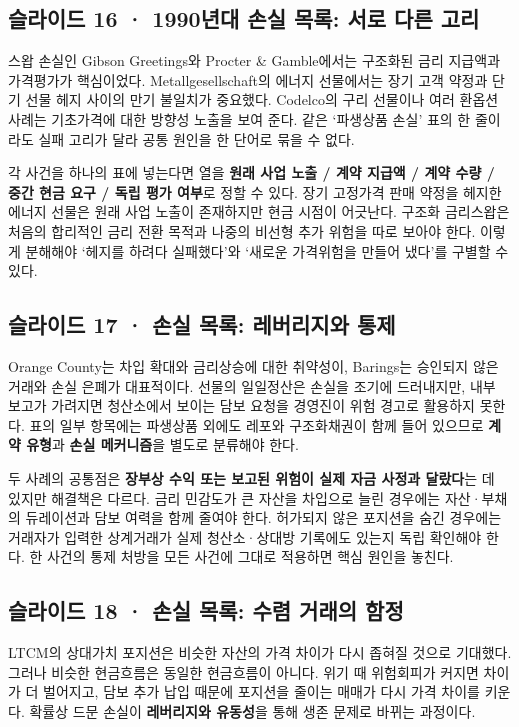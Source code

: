\documentclass[11pt,a4paper]{article}
\begin{document}
\subsection{슬라이드 16 · 1990년대 손실 목록: 서로 다른 고리}
스왑 손실인 Gibson Greetings와 Procter \& Gamble에서는 구조화된 금리 지급액과 가격평가가 핵심이었다. Metallgesellschaft의 에너지 선물에서는 장기 고객 약정과 단기 선물 헤지 사이의 만기 불일치가 중요했다. Codelco의 구리 선물이나 여러 환옵션 사례는 기초가격에 대한 방향성 노출을 보여 준다. 같은 ‘파생상품 손실’ 표의 한 줄이라도 실패 고리가 달라 공통 원인을 한 단어로 묶을 수 없다.\par

각 사건을 하나의 표에 넣는다면 열을 \textbf{원래 사업 노출 / 계약 지급액 / 계약 수량 / 중간 현금 요구 / 독립 평가 여부}로 정할 수 있다. 장기 고정가격 판매 약정을 헤지한 에너지 선물은 원래 사업 노출이 존재하지만 현금 시점이 어긋난다. 구조화 금리스왑은 처음의 합리적인 금리 전환 목적과 나중의 비선형 추가 위험을 따로 보아야 한다. 이렇게 분해해야 ‘헤지를 하려다 실패했다’와 ‘새로운 가격위험을 만들어 냈다’를 구별할 수 있다.\par

\subsection{슬라이드 17 · 손실 목록: 레버리지와 통제}
Orange County는 차입 확대와 금리상승에 대한 취약성이, Barings는 승인되지 않은 거래와 손실 은폐가 대표적이다. 선물의 일일정산은 손실을 조기에 드러내지만, 내부 보고가 가려지면 청산소에서 보이는 담보 요청을 경영진이 위험 경고로 활용하지 못한다. 표의 일부 항목에는 파생상품 외에도 레포와 구조화채권이 함께 들어 있으므로 \textbf{계약 유형}과 \textbf{손실 메커니즘}을 별도로 분류해야 한다.\par

두 사례의 공통점은 \textbf{장부상 수익 또는 보고된 위험이 실제 자금 사정과 달랐다}는 데 있지만 해결책은 다르다. 금리 민감도가 큰 자산을 차입으로 늘린 경우에는 자산·부채의 듀레이션과 담보 여력을 함께 줄여야 한다. 허가되지 않은 포지션을 숨긴 경우에는 거래자가 입력한 상계거래가 실제 청산소·상대방 기록에도 있는지 독립 확인해야 한다. 한 사건의 통제 처방을 모든 사건에 그대로 적용하면 핵심 원인을 놓친다.\par

\subsection{슬라이드 18 · 손실 목록: 수렴 거래의 함정}
LTCM의 상대가치 포지션은 비슷한 자산의 가격 차이가 다시 좁혀질 것으로 기대했다. 그러나 비슷한 현금흐름은 동일한 현금흐름이 아니다. 위기 때 위험회피가 커지면 차이가 더 벌어지고, 담보 추가 납입 때문에 포지션을 줄이는 매매가 다시 가격 차이를 키운다. 확률상 드문 손실이 \textbf{레버리지와 유동성}을 통해 생존 문제로 바뀌는 과정이다.\par
\end{document}
